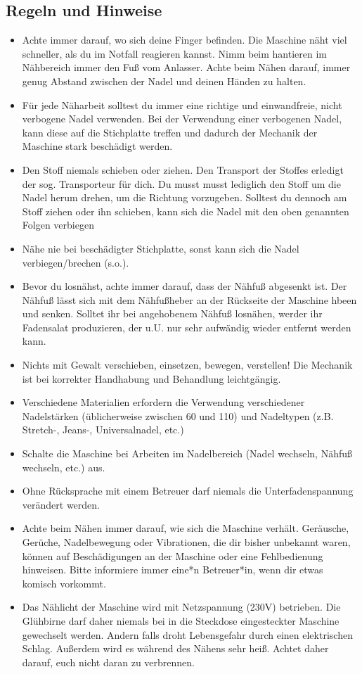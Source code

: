 \documentclass{\basedir/fablab-document}
\begin{document}
\subsection{Regeln und Hinweise}
\begin{itemize}
	\item Achte immer darauf, wo sich deine Finger befinden. Die Maschine näht viel schneller, als du im Notfall reagieren kannst. Nimm beim hantieren im Nähbereich immer den Fuß vom Anlasser. Achte beim Nähen darauf, immer genug Abstand zwischen der Nadel und deinen Händen zu halten.
	\item Für jede Näharbeit solltest du immer eine richtige und einwandfreie, nicht verbogene Nadel verwenden. Bei der Verwendung einer verbogenen Nadel, kann diese auf die Stichplatte treffen und dadurch der Mechanik der Maschine stark beschädigt werden.
	\item Den Stoff niemals schieben oder ziehen. Den Transport der Stoffes erledigt der sog. Transporteur für dich. Du musst musst lediglich den Stoff um die Nadel herum drehen, um die Richtung vorzugeben. Solltest du dennoch am Stoff ziehen oder ihn schieben, kann sich die Nadel mit den oben genannten Folgen verbiegen
	\item Nähe nie bei beschädigter Stichplatte, sonst kann sich die Nadel verbiegen/brechen (s.o.).
	\item Bevor du losnähst, achte immer darauf, dass der Nähfuß abgesenkt ist. Der Nähfuß lässt sich mit dem Nähfußheber an der Rückseite der Maschine hbeen und senken. Solltet ihr bei angehobenem Nähfuß losnähen, werder ihr Fadensalat produzieren, der u.U. nur sehr aufwändig wieder entfernt werden kann.
	\item Nichts mit Gewalt verschieben, einsetzen, bewegen, verstellen! Die Mechanik ist bei korrekter Handhabung und Behandlung leichtgängig.
	
	\item Verschiedene Materialien erfordern die Verwendung verschiedener Nadelstärken (üblicherweise zwischen 60 und 110) und Nadeltypen (z.B. Stretch-, Jeans-,  Universalnadel, etc.)
	\item Schalte die Maschine bei Arbeiten im Nadelbereich (Nadel wechseln, Nähfuß wechseln, etc.) aus.
	\item Ohne Rücksprache mit einem Betreuer darf niemals die Unterfadenspannung verändert werden.
	\item Achte beim Nähen immer darauf, wie sich die Maschine verhält. Geräusche, Gerüche, Nadelbewegung oder Vibrationen, die dir bisher unbekannt waren, können auf Beschädigungen an der Maschine oder eine Fehlbedienung hinweisen. Bitte informiere immer eine*n Betreuer*in, wenn dir etwas komisch vorkommt.
	\item Das Nählicht der Maschine wird mit Netzspannung (230V) betrieben. Die Glühbirne darf daher niemals bei in die Steckdose eingesteckter Maschine gewechselt werden. Andern falls droht Lebensgefahr durch einen elektrischen Schlag. Außerdem wird es während des Nähens sehr heiß. Achtet daher darauf, euch nicht daran zu verbrennen.
\end{itemize}
\end{document}
